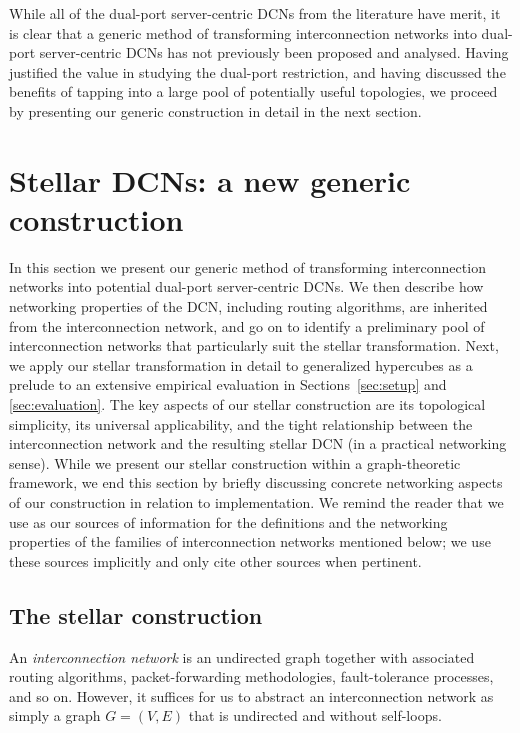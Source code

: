 \documentclass[]{amsart}
\begin{document}
While all of the dual-port server-centric DCNs from the literature have merit, it is clear that a generic method of transforming interconnection networks into dual-port server-centric DCNs has not previously been proposed and analysed. Having justified the value in studying the dual-port restriction, and having discussed the benefits of tapping into a large pool of potentially useful topologies, we proceed by presenting our generic construction in detail in the next section.









\section{Stellar DCNs: a new generic construction}
\label{sec:generic}

In this section we present our generic method of transforming
interconnection networks into potential dual-port server-centric DCNs.  We then describe how networking properties of the DCN, including routing algorithms, are inherited from the interconnection network, and go on to identify a preliminary pool of interconnection networks that particularly suit the stellar transformation. Next, we apply our stellar transformation in detail to generalized hypercubes as a prelude to an extensive empirical evaluation in Sections~\ref{sec:setup} and \ref{sec:evaluation}. The key aspects of our stellar construction are its topological simplicity, its universal applicability, and the tight relationship between the interconnection network and the resulting stellar DCN (in a practical networking sense). While we present our stellar construction within a graph-theoretic framework, we end this section by briefly discussing concrete networking aspects of our construction in relation to implementation. We remind the reader that we use \cite{DallyTowles2003,HsuLin2009,Xu2010} as our sources of information for the definitions and the networking properties of the families of interconnection networks mentioned below; we use these sources implicitly and only cite other sources when pertinent.

\subsection{The stellar construction}\label{sec:stellarcons}

An \emph{interconnection network\/} is an undirected  graph together with associated routing algorithms, packet-forwarding methodologies, fault-tolerance processes, and so on. However, it suffices for us to abstract an interconnection network as simply a graph $G=(V,E)$ that is undirected and without self-loops.
\end{document}
